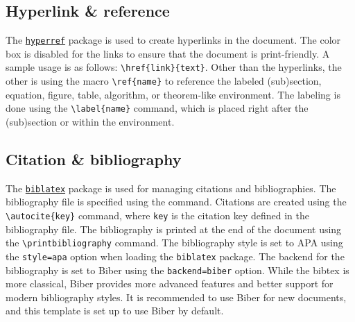 \subsection{Hyperlink \& reference}

The \href{https://ctan.org/pkg/hyperref}{\Verb|hyperref|} package is used to create hyperlinks in the document.
The color box is disabled for the links to ensure that the document is print-friendly.
A sample usage is as follows: \Verb|\href{link}{text}|.
Other than the hyperlinks, the other is using the macro \Verb|\ref{name}| to reference the labeled (sub)section, equation, figure, table, algorithm, or theorem-like environment.
The labeling is done using the \Verb|\label{name}| command, which is placed right after the (sub)section or within the environment.

\subsection{Citation \& bibliography}

The \href{https://ctan.org/pkg/biblatex}{\Verb|biblatex|} package is used for managing citations and bibliographies.
The bibliography file is specified using the \Verb|| command.
Citations are created using the \Verb|\autocite{key}| command, where \Verb|key| is the citation key defined in the bibliography file.
The bibliography is printed at the end of the document using the \Verb|\printbibliography| command.
The bibliography style is set to APA using the \Verb|style=apa| option when loading the \Verb|biblatex| package.
The backend for the bibliography is set to Biber using the \Verb|backend=biber| option.
While the bibtex is more classical, Biber provides more advanced features and better support for modern bibliography styles.
It is recommended to use Biber for new documents, and this template is set up to use Biber by default.